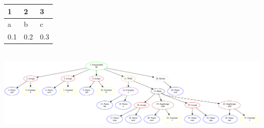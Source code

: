 \documentclass{article}
\begin{document}
\begin{tabular}{| l | l | l |}
\hline
1 & 2 & 3\\\hline
a & b & c\\\hline
0.1 & 0.2 & 0.3\\\hline
\end{tabular}
\\
\includegraphics[scale=0.15]{artifacts/example}
\end{document}
